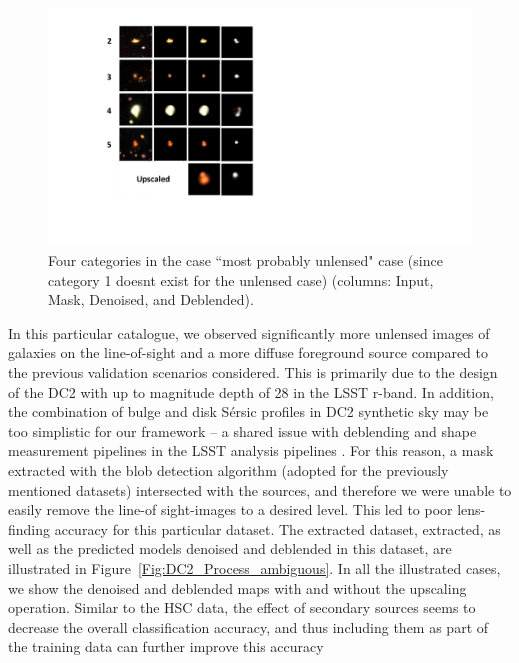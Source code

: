 \documentclass[12pt, twocolumn, apj]{openjournal}
\begin{document}
\begin{figure}[!t]
\centering
\includegraphics[width=\linewidth]{Figures/ltpt5_categories_V2.pdf}
\caption{Four categories in the case ``most probably unlensed" case (since category 1 doesnt exist for the unlensed case) (columns: Input, Mask, Denoised, and Deblended).}
\label{Fig:Five_categores_unlensed} 
\end{figure}

In this particular catalogue, we observed significantly more unlensed images of galaxies on the line-of-sight and a more diffuse foreground source compared to the previous validation scenarios considered. This is primarily due to the design of the DC2 with up to magnitude depth of 28 in the LSST r-band. In addition, the combination of bulge and disk Sérsic profiles in DC2 synthetic sky may be too simplistic for our framework -- a shared issue with deblending and shape measurement pipelines in the LSST analysis pipelines \cite{dc2}. For this reason, a mask extracted with the blob detection algorithm (adopted for the previously mentioned datasets) intersected with the sources, and therefore we were unable to easily remove the line-of sight-images to a desired level. This led to poor lens-finding accuracy for this particular dataset. The extracted dataset, extracted, as well as the predicted models denoised and deblended in this dataset, are illustrated in Figure~\ref{Fig:DC2_Process_ambiguous}. In all the illustrated cases, we show the denoised and deblended maps with and without the upscaling operation. 
Similar to the HSC data, the effect of secondary sources seems to decrease the overall classification accuracy, and thus including them as part of the training data can further improve this accuracy
\end{document}
